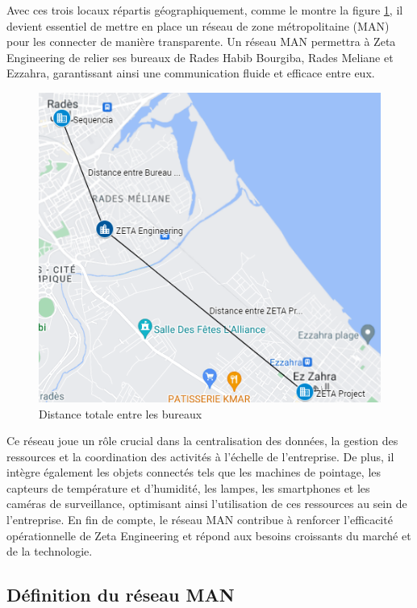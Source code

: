 Avec ces trois locaux répartis géographiquement, comme le montre la figure \ref{Chap2.6.0}, il devient essentiel de mettre en place un réseau de zone métropolitaine (MAN) pour les connecter de manière transparente. Un réseau MAN permettra à Zeta Engineering de relier ses bureaux de Rades Habib Bourgiba, Rades Meliane et Ezzahra, garantissant ainsi une communication fluide et efficace entre eux.

\begin{figure}[H]
\centering
\includegraphics[width=16cm]{Images/DistanceTotal.png}
\caption{Distance totale entre les bureaux}
\label{Chap2.6.0}
\end{figure}

Ce réseau joue un rôle crucial dans la centralisation des données, la gestion des ressources et la coordination des activités à l'échelle de l'entreprise. De plus, il intègre également les objets connectés tels que les machines de pointage, les capteurs de température et d'humidité, les lampes, les smartphones et les caméras de surveillance, optimisant ainsi l'utilisation de ces ressources au sein de l'entreprise. En fin de compte, le réseau MAN contribue à renforcer l'efficacité opérationnelle de Zeta Engineering et répond aux besoins croissants du marché et de la technologie.


\subsection{Définition du réseau MAN}

